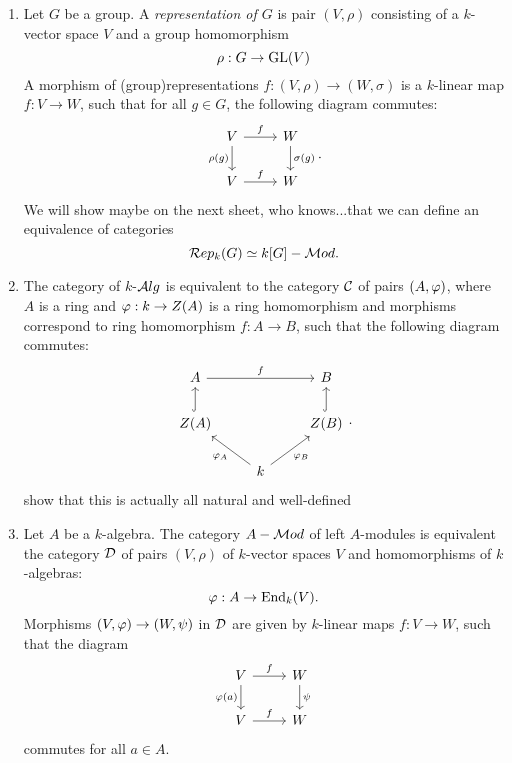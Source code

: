 \begin{bsp}
\begin{enumerate}
\begin{proof}
\begin{align*}
        \end{align*}
        So $\pphi$ is indeed a natural transformation.
        The other map is also a natural transformation. This follows from the fact that it is an isomorphism of representations, as was shown in the proof of \cref{3:eqcat}.
    \end{proof}
    \come
    \item Let $G$ be a group. A \emph{representation of $G$}  is pair $(V,\rho)$ consisting of a $k$-vector space $V$ and a group homomorphism
    \[
    \rho: G\to \operatorname{GL}(V)
    \]
    A morphism of \coms(group)\come representations $f:(V,\rho)\to (W,\sigma)$ is a $k$-linear map $f:V\to W$, such that for all $g\in G$, the following diagram commutes:
    \[
    \begin{tikzcd}
      V\ar{r}{f}\ar[swap]{d}{\rho(g)}&W\ar{d}{\sigma(g)}\\
      V\ar{r}{f}&W
    \end{tikzcd}.
    \]
    We will show \coms maybe on the next sheet, who knows...\come that we can define an equivalence of categories
    \[
    \mathcal{R}ep_k(G)\simeq k[G]-\mathcal{M}od.
    \]
    \item The category of $k$-$\mathcal{A}lg$ is equivalent to the category $\mathcal{C}$ of pairs $(A,\varphi)$, where $A$ is a ring and $\varphi:k\to Z(A)$ \coms is a ring homomorphism\come{} and morphisms correspond to ring homomorphism $f:A\to B$, such that the following diagram commutes:
    \[
    \begin{tikzcd}
			A\ar{rr}{f}&&B\\
			Z(A)\ar[hookrightarrow]{u}&&\ar[hookrightarrow]{u}Z(B)\\
			&k\ar{ul}{\pphi_A}\ar[swap]{ur}{\pphi_B}&
		\end{tikzcd}.
		\]\coms show that this is actually all natural and well-defined\come
    \item Let $A$ be a $k$-algebra. The category $A-\mathcal{M}od$ of left $A$-modules is equivalent the category $\mathcal{D}$ of pairs $(V,\rho)$ of $k$-vector spaces $V$ and homomorphisms of $k$-algebras:
    \[
    \varphi:A\to \operatorname{End}_k(V).\]
    Morphisms $(V,\varphi)\to (W,\psi)$ in $\mathcal{D}$ are given by $k$-linear maps $f:V\to W$, such that the diagram
    \[
    \begin{tikzcd}
      V\ar{r}{f}\ar[swap]{d}{\pphi(a)}&W\ar{d}{\psi}\\
      V\ar{r}{f}&W
    \end{tikzcd}
    \]
    commutes for all $a\in A$.
  \end{enumerate}
\end{bsp}

